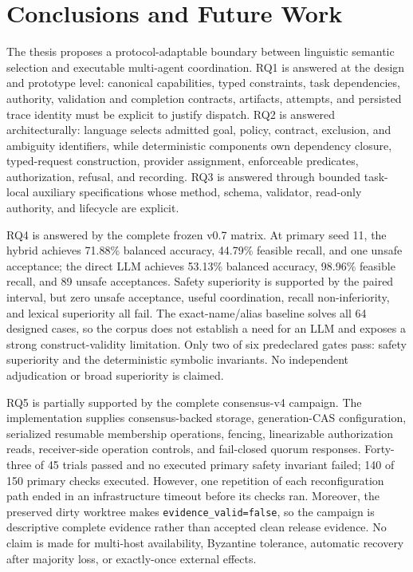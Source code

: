 \chapter{Conclusions and Future Work}
\label{chap:conclusion}

The thesis proposes a protocol-adaptable boundary between linguistic semantic selection and executable multi-agent coordination. RQ1 is answered at the design and prototype level: canonical capabilities, typed constraints, task dependencies, authority, validation and completion contracts, artifacts, attempts, and persisted trace identity must be explicit to justify dispatch. RQ2 is answered architecturally: language selects admitted goal, policy, contract, exclusion, and ambiguity identifiers, while deterministic components own dependency closure, typed-request construction, provider assignment, enforceable predicates, authorization, refusal, and recording. RQ3 is answered through bounded task-local auxiliary specifications whose method, schema, validator, read-only authority, and lifecycle are explicit.

RQ4 is answered by the complete frozen v0.7 matrix. At primary seed 11, the hybrid achieves 71.88\% balanced accuracy, 44.79\% feasible recall, and one unsafe acceptance; the direct LLM achieves 53.13\% balanced accuracy, 98.96\% feasible recall, and 89 unsafe acceptances. Safety superiority is supported by the paired interval, but zero unsafe acceptance, useful coordination, recall non-inferiority, and lexical superiority all fail. The exact-name/alias baseline solves all 64 designed cases, so the corpus does not establish a need for an LLM and exposes a strong construct-validity limitation. Only two of six predeclared gates pass: safety superiority and the deterministic symbolic invariants. No independent adjudication or broad superiority is claimed.

RQ5 is partially supported by the complete consensus-v4 campaign. The implementation supplies consensus-backed storage, generation-CAS configuration, serialized resumable membership operations, fencing, linearizable authorization reads, receiver-side operation controls, and fail-closed quorum responses. Forty-three of 45 trials passed and no executed primary safety invariant failed; 140 of 150 primary checks executed. However, one repetition of each reconfiguration path ended in an infrastructure timeout before its checks ran. Moreover, the preserved dirty worktree makes \texttt{evidence\_valid=false}, so the campaign is descriptive complete evidence rather than accepted clean release evidence. No claim is made for multi-host availability, Byzantine tolerance, automatic recovery after majority loss, or exactly-once external effects.

